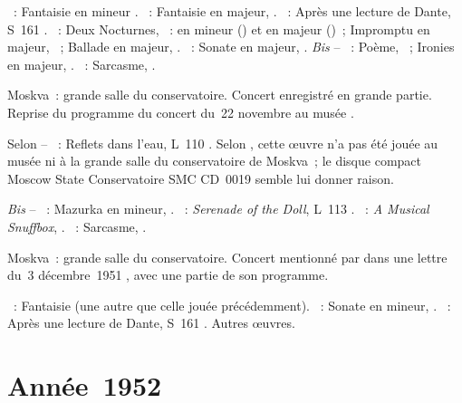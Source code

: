 \begin{description}
 \textsc{\Mozart{}}~: Fantaisie en \kC mineur .
 \textsc{\Schumann{}}~: Fantaisie en \kC majeur, .
 \textsc{\Liszt{}}~: Après une lecture de Dante, S~161 .
 \textsc{\Chopin{}}~: Deux Nocturnes, ~: en \kC \Sharp mineur
 () et en \kD \Flat majeur ()~; Impromptu en \kG \Flat
 majeur, ~; Ballade en \kA \Flat majeur, .
 \textsc{\Scriabine{}}~: Sonate en \kF \Sharp majeur, .
 \emph{Bis} -- \textsc{\Scriabine{}}~: Poème,  ~;
 Ironies en \kC majeur,  .
 \textsc{\Prokofiev{}}~: Sarcasme,  .
 \item[\DateWithWeekDay{1951-11-26}]
 Moskva~: grande salle du conservatoire.
 Concert enregistré en grande partie.
 Reprise du programme du concert du~22 novembre au musée \Scriabine{}.

 Selon \ASofronitsky{} -- \textsc{\Debussy{}}~: Reflets dans l'eau, L~110
 .
 Selon \NKalinenko{}, cette œuvre n'a pas été jouée au musée \Scriabine{}
 ni à la grande salle du conservatoire de Moskva~; le disque compact Moscow
 State Conservatoire SMC CD~0019 semble lui donner raison.

 \emph{Bis} -- \textsc{\Chopin{}}~: Mazurka en \kE mineur, 
 .
 \textsc{\Debussy{}}~: \emph{Serenade of the Doll}, L~113 .
 \textsc{\Liadov{}}~: \emph{A Musical Snuffbox}, .
 \textsc{\Prokofiev{}}~: Sarcasme,  .
 \item[\DateWithWeekDay{1951-12-16}]
 Moskva~: grande salle du conservatoire.
 Concert mentionné par \VSofronitsky{} dans une lettre du~3 décembre~1951
 \citep[voir][p.~172]{Nekrasova08}, avec une partie de son programme.

 \textsc{\Mozart{}}~: Fantaisie (une autre que celle jouée précédemment).
 \textsc{\Beethoven{}}~: Sonate  en \kC \Sharp mineur, 
 .
 \textsc{\Liszt{}}~: Après une lecture de Dante, S~161 .
 Autres œuvres.
\end{description}

\section{Année~1952}

